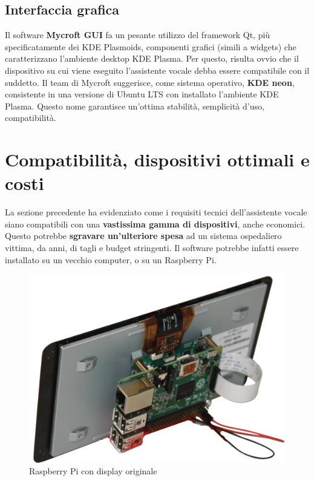 \subsection{Interfaccia grafica}
Il software \textbf{Mycroft GUI} fa un pesante utilizzo del framework Qt, più specificatamente dei KDE Plasmoids, componenti grafici (simili a widgets) che caratterizzano l'ambiente desktop KDE Plasma. Per questo, risulta ovvio che il dispositivo su cui viene eseguito l'assistente vocale debba essere compatibile con il suddetto. Il team di Mycroft suggerisce, come sistema operativo, \textbf{KDE neon}, consistente in una versione di  Ubuntu LTS con installato l'ambiente KDE Plasma. Questo nome garantisce un'ottima stabilità, semplicità d'uso, compatibilità.
\section{Compatibilità, dispositivi ottimali e costi}
La sezione precedente ha evidenziato come i requisiti tecnici dell'assistente vocale siano compatibili con una \textbf{vastissima gamma di dispositivi}, anche economici. Questo potrebbe \textbf{sgravare un'ulteriore spesa} ad un sistema ospedaliero vittima, da anni, di tagli e budget stringenti. Il software potrebbe infatti essere installato su un vecchio computer, o su un Raspberry Pi.
\begin{figure}[H]
    \begin{center}
        \includegraphics[width=0.8\columnwidth]{images/applicabilita/RPiwithDisplay.png}
    \end{center}
    \caption{Raspberry Pi con display originale}
    \label{fig:raspi-with-display}
\end{figure}
